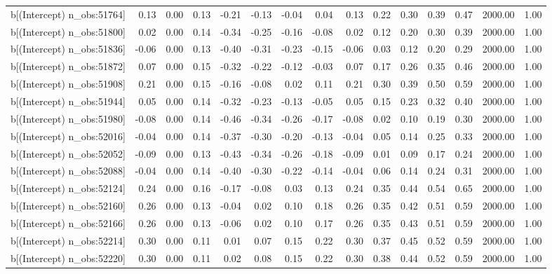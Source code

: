 \begin{table}[ht]
\begin{tabular}{rrrrrrrrrrrrrrr}
  b[(Intercept) n\_obs:51764] & 0.13 & 0.00 & 0.13 & -0.21 & -0.13 & -0.04 & 0.04 & 0.13 & 0.22 & 0.30 & 0.39 & 0.47 & 2000.00 & 1.00 \\ 
  b[(Intercept) n\_obs:51800] & 0.02 & 0.00 & 0.14 & -0.34 & -0.25 & -0.16 & -0.08 & 0.02 & 0.12 & 0.20 & 0.30 & 0.39 & 2000.00 & 1.00 \\ 
  b[(Intercept) n\_obs:51836] & -0.06 & 0.00 & 0.13 & -0.40 & -0.31 & -0.23 & -0.15 & -0.06 & 0.03 & 0.12 & 0.20 & 0.29 & 2000.00 & 1.00 \\ 
  b[(Intercept) n\_obs:51872] & 0.07 & 0.00 & 0.15 & -0.32 & -0.22 & -0.12 & -0.03 & 0.07 & 0.17 & 0.26 & 0.35 & 0.46 & 2000.00 & 1.00 \\ 
  b[(Intercept) n\_obs:51908] & 0.21 & 0.00 & 0.15 & -0.16 & -0.08 & 0.02 & 0.11 & 0.21 & 0.30 & 0.39 & 0.50 & 0.59 & 2000.00 & 1.00 \\ 
  b[(Intercept) n\_obs:51944] & 0.05 & 0.00 & 0.14 & -0.32 & -0.23 & -0.13 & -0.05 & 0.05 & 0.15 & 0.23 & 0.32 & 0.40 & 2000.00 & 1.00 \\ 
  b[(Intercept) n\_obs:51980] & -0.08 & 0.00 & 0.14 & -0.46 & -0.34 & -0.26 & -0.17 & -0.08 & 0.02 & 0.10 & 0.19 & 0.30 & 2000.00 & 1.00 \\ 
  b[(Intercept) n\_obs:52016] & -0.04 & 0.00 & 0.14 & -0.37 & -0.30 & -0.20 & -0.13 & -0.04 & 0.05 & 0.14 & 0.25 & 0.33 & 2000.00 & 1.00 \\ 
  b[(Intercept) n\_obs:52052] & -0.09 & 0.00 & 0.13 & -0.43 & -0.34 & -0.26 & -0.18 & -0.09 & 0.01 & 0.09 & 0.17 & 0.24 & 2000.00 & 1.00 \\ 
  b[(Intercept) n\_obs:52088] & -0.04 & 0.00 & 0.14 & -0.40 & -0.30 & -0.22 & -0.14 & -0.04 & 0.06 & 0.14 & 0.24 & 0.31 & 2000.00 & 1.00 \\ 
  b[(Intercept) n\_obs:52124] & 0.24 & 0.00 & 0.16 & -0.17 & -0.08 & 0.03 & 0.13 & 0.24 & 0.35 & 0.44 & 0.54 & 0.65 & 2000.00 & 1.00 \\ 
  b[(Intercept) n\_obs:52160] & 0.26 & 0.00 & 0.13 & -0.04 & 0.02 & 0.10 & 0.18 & 0.26 & 0.35 & 0.42 & 0.51 & 0.59 & 2000.00 & 1.00 \\ 
  b[(Intercept) n\_obs:52166] & 0.26 & 0.00 & 0.13 & -0.06 & 0.02 & 0.10 & 0.17 & 0.26 & 0.35 & 0.43 & 0.51 & 0.59 & 2000.00 & 1.00 \\ 
  b[(Intercept) n\_obs:52214] & 0.30 & 0.00 & 0.11 & 0.01 & 0.07 & 0.15 & 0.22 & 0.30 & 0.37 & 0.45 & 0.52 & 0.59 & 2000.00 & 1.00 \\ 
  b[(Intercept) n\_obs:52220] & 0.30 & 0.00 & 0.11 & 0.02 & 0.08 & 0.15 & 0.22 & 0.30 & 0.38 & 0.44 & 0.52 & 0.59 & 2000.00 & 1.00 \\ 

\end{tabular}
\end{table}
